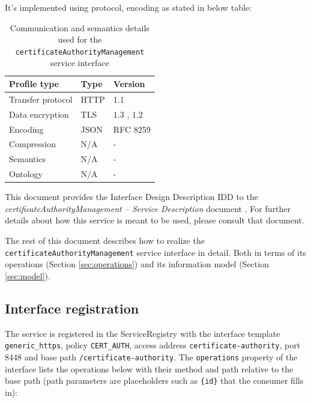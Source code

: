 \documentclass[a4paper]{arrowhead}
\begin{document}
It's implemented using protocol, encoding as stated in below table:
\begin{table}[ht!]
  \centering
  \begin{tabular}{|l|l|l|}
    \hline
    \rowcolor{gray!33} Profile type & Type & Version \\ \hline
    Transfer protocol & HTTP & 1.1 \cite{rfc9112} \\ \hline
    Data encryption & TLS & 1.3 \cite{rfc8446}, 1.2 \cite{rfc5246} \\ \hline
    Encoding & JSON & RFC 8259 \cite{rfc8259} \\ \hline
    Compression & N/A & - \\ \hline
    Semantics & N/A & - \\ \hline
    Ontology & N/A & - \\ \hline
  \end{tabular}
  \caption{Communication and semantics details used for the \texttt{certificate\allowbreak{}Authority\allowbreak{}Management} service interface}
  \label{tab:comunication_semantics_profile}
\end{table}

This document provides the Interface Design Description IDD to the \textit{certificateAuthorityManagement -- Service Description} document \cite{cau-certificateAuthorityManagement-sd}.
For further details about how this service is meant to be used, please consult that document.

The rest of this document describes how to realize the \texttt{certificate\allowbreak{}Authority\allowbreak{}Management} service
interface in detail. Both in terms of its operations (Section \ref{sec:operations}) and its information model (Section \ref{sec:model}).

\subsection{Interface registration}

The service is registered in the ServiceRegistry with the interface template \texttt{generic\_\allowbreak{}https}, policy \texttt{CERT\_\allowbreak{}AUTH}, access address \texttt{certificate-\allowbreak{}authority}, port 8448 and base path \texttt{/\allowbreak{}certificate-\allowbreak{}authority}. The \texttt{operations} property of the interface lists the operations below with their method and path relative to the base path (path parameters are placeholders such as \texttt{\{id\}} that the consumer fills in):
\end{document}
